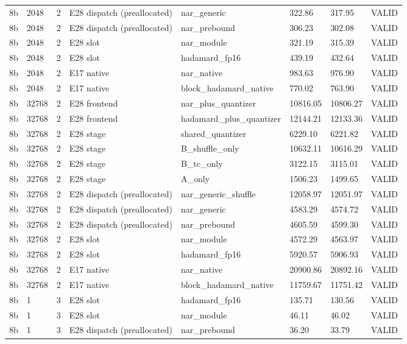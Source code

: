 {\begin{longtable}{llllllll}
8b & 2048 & 2 & E28 dispatch (preallocated) & nar\_generic & 322.86 & 317.95 & VALID \\
8b & 2048 & 2 & E28 dispatch (preallocated) & nar\_prebound & 306.23 & 302.08 & VALID \\
8b & 2048 & 2 & E28 slot & nar\_module & 321.19 & 315.39 & VALID \\
8b & 2048 & 2 & E28 slot & hadamard\_fp16 & 439.19 & 432.64 & VALID \\
8b & 2048 & 2 & E17 native & nar\_native & 983.63 & 976.90 & VALID \\
8b & 2048 & 2 & E17 native & block\_hadamard\_native & 770.02 & 763.90 & VALID \\
8b & 32768 & 2 & E28 frontend & nar\_plus\_quantizer & 10816.05 & 10806.27 & VALID \\
8b & 32768 & 2 & E28 frontend & hadamard\_plus\_quantizer & 12144.21 & 12133.36 & VALID \\
8b & 32768 & 2 & E28 stage & shared\_quantizer & 6229.10 & 6221.82 & VALID \\
8b & 32768 & 2 & E28 stage & B\_shuffle\_only & 10632.11 & 10616.29 & VALID \\
8b & 32768 & 2 & E28 stage & B\_tc\_only & 3122.15 & 3115.01 & VALID \\
8b & 32768 & 2 & E28 stage & A\_only & 1506.23 & 1499.65 & VALID \\
8b & 32768 & 2 & E28 dispatch (preallocated) & nar\_generic\_shuffle & 12058.97 & 12051.97 & VALID \\
8b & 32768 & 2 & E28 dispatch (preallocated) & nar\_generic & 4583.29 & 4574.72 & VALID \\
8b & 32768 & 2 & E28 dispatch (preallocated) & nar\_prebound & 4605.59 & 4599.30 & VALID \\
8b & 32768 & 2 & E28 slot & nar\_module & 4572.29 & 4563.97 & VALID \\
8b & 32768 & 2 & E28 slot & hadamard\_fp16 & 5920.57 & 5906.93 & VALID \\
8b & 32768 & 2 & E17 native & nar\_native & 20900.86 & 20892.16 & VALID \\
8b & 32768 & 2 & E17 native & block\_hadamard\_native & 11759.67 & 11751.42 & VALID \\
8b & 1 & 3 & E28 slot & hadamard\_fp16 & 135.71 & 130.56 & VALID \\
8b & 1 & 3 & E28 slot & nar\_module & 46.11 & 46.02 & VALID \\
8b & 1 & 3 & E28 dispatch (preallocated) & nar\_prebound & 36.20 & 33.79 & VALID \\

\end{longtable}}
